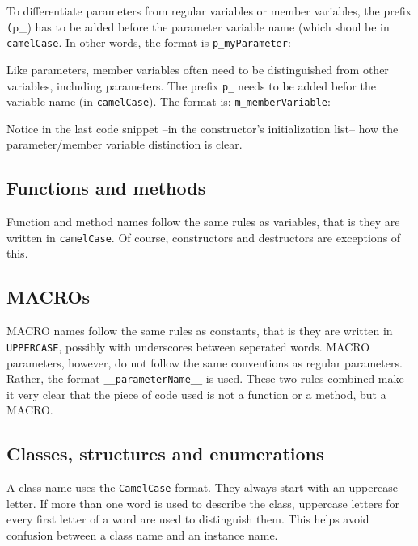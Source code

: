 
To differentiate parameters from regular variables or member variables, the 
prefix \texttt(p\_) has to be added before the parameter variable name (which 
shoul be in \texttt{camelCase}. In other words, the format is 
\texttt{p\_myParameter}:


Like parameters, member variables often need to be distinguished from other 
variables, including parameters. The prefix \texttt{p\_} needs to be added 
befor the variable name (in \texttt{camelCase}). The format is: 
\texttt{m\_memberVariable}:


Notice in the last code snippet --in the constructor's initialization list-- 
how the parameter/member variable distinction is clear.
  
\subsection{Functions and methods}
Function and method names follow the same rules as variables, that is they are 
written in \texttt{camelCase}. Of course, constructors and destructors are 
exceptions of this.

  
\subsection{MACROs}
MACRO names follow the same rules as constants, that is they are written in 
\texttt{UPPERCASE}, possibly with underscores between seperated words. MACRO 
parameters, however, do not follow the same conventions as regular parameters. 
Rather, the format \texttt{\_\_parameterName\_\_} is used. These two rules 
combined make it very clear that the piece of code used is not a function or a 
method, but a MACRO.


\subsection{Classes, structures and enumerations}

A class name uses the \texttt{CamelCase} format. They always start with an 
uppercase letter. If more than one word is used to describe the class, 
uppercase letters for every first letter of a word are used to distinguish 
them. This helps avoid confusion between a class name and an instance name.

